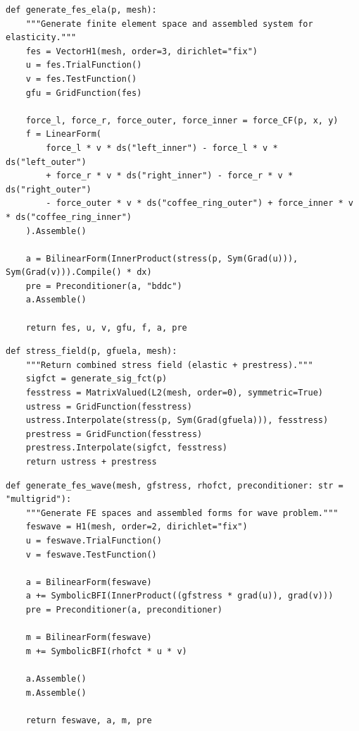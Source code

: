 \begin{verbatim}
def generate_fes_ela(p, mesh):
    """Generate finite element space and assembled system for elasticity."""
    fes = VectorH1(mesh, order=3, dirichlet="fix")
    u = fes.TrialFunction()
    v = fes.TestFunction()
    gfu = GridFunction(fes)

    force_l, force_r, force_outer, force_inner = force_CF(p, x, y)
    f = LinearForm(
        force_l * v * ds("left_inner") - force_l * v * ds("left_outer")
        + force_r * v * ds("right_inner") - force_r * v * ds("right_outer")
        - force_outer * v * ds("coffee_ring_outer") + force_inner * v * ds("coffee_ring_inner")
    ).Assemble()

    a = BilinearForm(InnerProduct(stress(p, Sym(Grad(u))), Sym(Grad(v))).Compile() * dx)
    pre = Preconditioner(a, "bddc")
    a.Assemble()

    return fes, u, v, gfu, f, a, pre
\end{verbatim}
\clearpage
\begin{verbatim}
def stress_field(p, gfuela, mesh):
    """Return combined stress field (elastic + prestress)."""
    sigfct = generate_sig_fct(p)
    fesstress = MatrixValued(L2(mesh, order=0), symmetric=True)
    ustress = GridFunction(fesstress)
    ustress.Interpolate(stress(p, Sym(Grad(gfuela))), fesstress)
    prestress = GridFunction(fesstress)
    prestress.Interpolate(sigfct, fesstress)
    return ustress + prestress
\end{verbatim}
\clearpage
\begin{verbatim}
def generate_fes_wave(mesh, gfstress, rhofct, preconditioner: str = "multigrid"):
    """Generate FE spaces and assembled forms for wave problem."""
    feswave = H1(mesh, order=2, dirichlet="fix")
    u = feswave.TrialFunction()
    v = feswave.TestFunction()

    a = BilinearForm(feswave)
    a += SymbolicBFI(InnerProduct((gfstress * grad(u)), grad(v)))
    pre = Preconditioner(a, preconditioner)

    m = BilinearForm(feswave)
    m += SymbolicBFI(rhofct * u * v)

    a.Assemble()
    m.Assemble()

    return feswave, a, m, pre

\end{verbatim}
\clearpage
